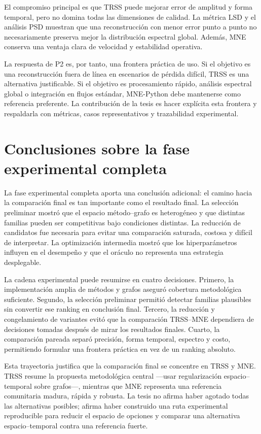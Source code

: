 El compromiso principal es que TRSS puede mejorar error de amplitud y forma temporal, pero no domina todas las dimensiones de calidad. La métrica LSD y el análisis PSD muestran que una reconstrucción con menor error punto a punto no necesariamente preserva mejor la distribución espectral global. Además, MNE conserva una ventaja clara de velocidad y estabilidad operativa.

La respuesta de P2 es, por tanto, una frontera práctica de uso. Si el objetivo es una reconstrucción fuera de línea en escenarios de pérdida difícil, TRSS es una alternativa justificable. Si el objetivo es procesamiento rápido, análisis espectral global o integración en flujos estándar, MNE-Python debe mantenerse como referencia preferente. La contribución de la tesis es hacer explícita esta frontera y respaldarla con métricas, casos representativos y trazabilidad experimental.

\section{Conclusiones sobre la fase experimental completa}

La fase experimental completa aporta una conclusión adicional: el camino hacia la comparación final es tan importante como el resultado final. La selección preliminar mostró que el espacio método--grafo es heterogéneo y que distintas familias pueden ser competitivas bajo condiciones distintas. La reducción de candidatos fue necesaria para evitar una comparación saturada, costosa y difícil de interpretar. La optimización intermedia mostró que los hiperparámetros influyen en el desempeño y que el oráculo no representa una estrategia desplegable.

La cadena experimental puede resumirse en cuatro decisiones. Primero, la implementación amplia de métodos y grafos aseguró cobertura metodológica suficiente. Segundo, la selección preliminar permitió detectar familias plausibles sin convertir ese ranking en conclusión final. Tercero, la reducción y congelamiento de variantes evitó que la comparación TRSS--MNE dependiera de decisiones tomadas después de mirar los resultados finales. Cuarto, la comparación pareada separó precisión, forma temporal, espectro y costo, permitiendo formular una frontera práctica en vez de un ranking absoluto.

Esta trayectoria justifica que la comparación final se concentre en TRSS y MNE. TRSS resume la propuesta metodológica central —usar regularización espacio--temporal sobre grafos—, mientras que MNE representa una referencia comunitaria madura, rápida y robusta. La tesis no afirma haber agotado todas las alternativas posibles; afirma haber construido una ruta experimental reproducible para reducir el espacio de opciones y comparar una alternativa espacio--temporal contra una referencia fuerte.

